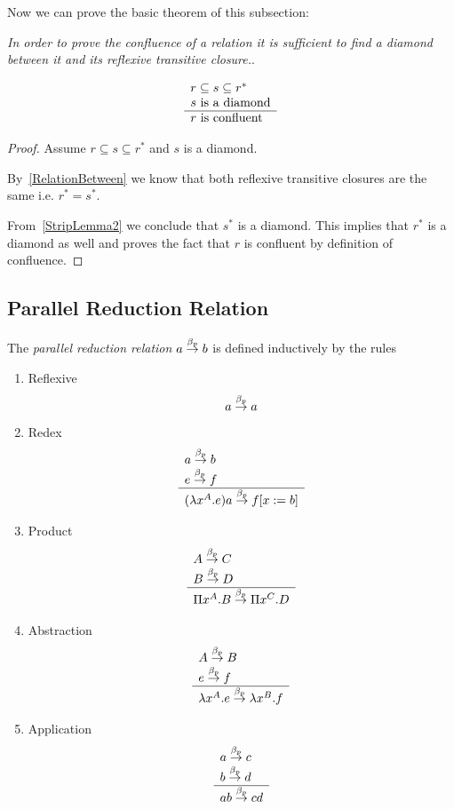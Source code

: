 Now we can prove the basic theorem of this subsection:

\begin{theorem}
    \label{DiamondBetween}
    \emph{In order to prove the confluence of a relation it is sufficient to
    find a diamond between it and its reflexive transitive closure.}.

    $$
    \begin{array}{l} 
        r \subseteq s \subseteq r^*
        \\
        s \text{ is a diamond}
     \\ \hline 
        r \text{ is confluent}
    \end{array}
    $$

    \begin{proof}
        Assume $r \subseteq s \subseteq r^*$ and $s$ is a diamond.

        By~\ref{RelationBetween} we know that both reflexive transitive closures
        are the same i.e. $r^* = s^*$.

        From~\ref{StripLemma2} we conclude that $s^*$ is a diamond. This implies
        that $r^*$ is a diamond as well and proves the fact that $r$ is
        confluent by definition of confluence.
    \end{proof}
\end{theorem}










\subsection{Parallel Reduction Relation}




\begin{definition}
    The \emph{parallel reduction relation} $a \stackrel{\beta_p}{\to} b$ is defined inductively
    by the rules
    \begin{enumerate}
    \item Reflexive
    $$
        a \stackrel{\beta_p}{\to} a
    $$

    \item Redex
    $$
        \begin{array}{l} 
            a \stackrel{\beta_p}{\to} b
            \\
            e \stackrel{\beta_p}{\to} f
         \\ \hline 
            (\lambda x^A. e) a \stackrel{\beta_p}{\to} f[x:=b]
        \end{array}
    $$

    \item Product
    $$
    \begin{array}{l} 
        A \stackrel{\beta_p}{\to} C
        \\
        B \stackrel{\beta_p}{\to} D
     \\ \hline 
        \Pi x^A. B \stackrel{\beta_p}{\to} \Pi x^C. D
    \end{array}
    $$

    \item Abstraction
    $$
    \begin{array}{l} 
        A \stackrel{\beta_p}{\to} B
        \\
        e \stackrel{\beta_p}{\to} f
     \\ \hline 
        \lambda x^A. e \stackrel{\beta_p}{\to} \lambda x^B. f
    \end{array}
    $$

    \item Application
    $$
    \begin{array}{l} 
        a \stackrel{\beta_p}{\to} c
        \\
        b \stackrel{\beta_p}{\to} d
     \\ \hline 
        a b \stackrel{\beta_p}{\to} c d
    \end{array}
    $$
    \end{enumerate}
\end{definition}


